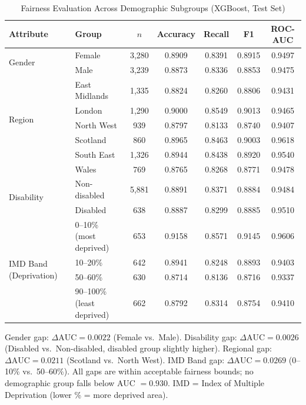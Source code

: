 \begin{table}[!t]
  \renewcommand{\arraystretch}{1.25}
  \caption{Fairness Evaluation Across Demographic Subgroups (XGBoost, Test Set)}
  \label{tab:fairness}
  \centering
  \begin{tabular}{llccccc}
    \hline
    \textbf{Attribute} & \textbf{Group} & \textbf{$n$} & \textbf{Accuracy} & \textbf{Recall} & \textbf{F1} & \textbf{ROC-AUC} \\
    \hline
    \multirow{2}{*}{Gender}
      & Female  & 3,280 & 0.8909 & 0.8391 & 0.8915 & 0.9497 \\
      & Male    & 3,239 & 0.8873 & 0.8336 & 0.8853 & 0.9475 \\
    \hline
    \multirow{5}{*}{Region}
      & East Midlands & 1,335 & 0.8824 & 0.8260 & 0.8806 & 0.9431 \\
      & London        & 1,290 & 0.9000 & 0.8549 & 0.9013 & 0.9465 \\
      & North West    & 939   & 0.8797 & 0.8133 & 0.8740 & 0.9407 \\
      & Scotland      & 860   & 0.8965 & 0.8463 & 0.9003 & 0.9618 \\
      & South East    & 1,326 & 0.8944 & 0.8438 & 0.8920 & 0.9540 \\
      & Wales         & 769   & 0.8765 & 0.8268 & 0.8771 & 0.9478 \\
    \hline
    \multirow{2}{*}{Disability}
      & Non-disabled  & 5,881 & 0.8891 & 0.8371 & 0.8884 & 0.9484 \\
      & Disabled      & 638   & 0.8887 & 0.8299 & 0.8885 & 0.9510 \\
    \hline
    \multirow{4}{*}{IMD Band (Deprivation)}
      & 0--10\%  (most deprived)   & 653 & 0.9158 & 0.8571 & 0.9145 & 0.9606 \\
      & 10--20\%                   & 642 & 0.8941 & 0.8248 & 0.8893 & 0.9403 \\
      & 50--60\%                   & 630 & 0.8714 & 0.8136 & 0.8716 & 0.9337 \\
      & 90--100\% (least deprived) & 662 & 0.8792 & 0.8314 & 0.8754 & 0.9410 \\
    \hline
  \end{tabular}
  \vspace{1mm}
  \begin{flushleft}
    \small
    Gender gap: $\Delta\mathrm{AUC} = 0.0022$ (Female vs.\ Male). 
    Disability gap: $\Delta\mathrm{AUC} = 0.0026$ (Disabled vs.\ Non-disabled, disabled group slightly higher). 
    Regional gap: $\Delta\mathrm{AUC} = 0.0211$ (Scotland vs.\ North West). 
    IMD Band gap: $\Delta\mathrm{AUC} = 0.0269$ (0–10\% vs.\ 50–60\%). 
    All gaps are within acceptable fairness bounds; no demographic group falls below AUC $= 0.930$.
    IMD = Index of Multiple Deprivation (lower \% = more deprived area).
  \end{flushleft}
\end{table}


